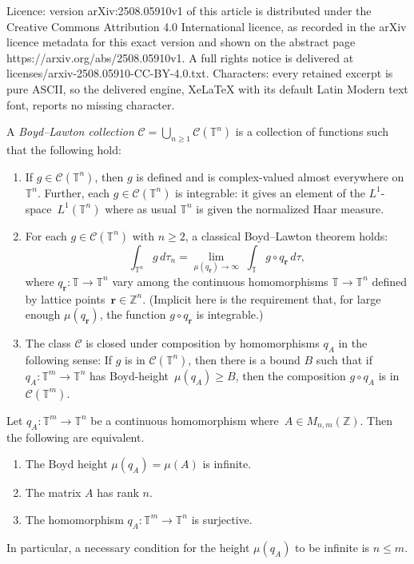 \documentclass[10pt,a4paper]{amsart}
\newcommand{\bZ}{{\mathbb{Z}}}
\newcommand{\mb}{\mathbf}
\newcommand{\mc}{\mathcal}
\newcommand{\torus}{{\mathbb{T}}}
\begin{document}
Licence: version arXiv:2508.05910v1 of this article is distributed under the Creative Commons Attribution 4.0 International licence, as recorded in the arXiv licence metadata for this exact version and shown on the abstract page https://arxiv.org/abs/2508.05910v1. A full rights notice is delivered at licenses/arxiv-2508.05910-CC-BY-4.0.txt. Characters: every retained excerpt is pure ASCII, so the delivered engine, XeLaTeX with its default Latin Modern text font, reports no missing character.
\begin{definition} \label{BL collection def}
A \emph{Boyd--Lawton collection} 
 $\mc C = \bigcup_{n \ge 1} \mc C (\torus^n)$ is a collection of functions such that the following hold:
\begin{enumerate}
\item
If $g \in \mc C (\torus^n)$, then $g$ is defined and is complex-valued almost everywhere on $\torus^n$. Further, each $g \in \mc C(\torus^n)$
is integrable: it gives an element of the $L^1$-space~$L^1(\torus^n)$ where as usual $\torus^n$ is given the normalized Haar measure.
\item
For each $g\in \mc C(\torus^n)$ with $n\ge 2$, a classical Boyd--Lawton theorem holds:
$$
\int_{\torus^n}  g \, d\tau_n= \lim_{\mu(q_\mb r)\to \infty}\;  \int_\torus g \circ q_{\mb r} \, d \tau,
$$
where $q_{\mb r} \colon \torus \to \torus^n$ vary among the continuous homomorphisms $\torus \to\torus^n$ defined by lattice points~$\mb r \in \bZ^n$.
(Implicit here is the requirement that, for large enough $\mu\left(q_\mb r\right)$, the function $g \circ q_{\mb r}$ is integrable.)

\item
The class $\mc C$ is closed under composition by homomorphisms $q_{A}$
in the following sense: If $g$ is in $\mc C(\torus^n)$, then there is a bound $B$ such that if $q_A \colon \torus^m \to \torus^n$ has Boyd-height~$\mu (q_A) \ge B$, 
then the composition  $g\circ q_{A}$ is in $\mc C(\torus^m)$.
\end{enumerate}
\end{definition}

\begin{proposition} \label{infinite_height_lemma}
Let $q_A \colon \torus^m \to \torus^n$ be a continuous homomorphism where~$A \in M_{n, m}(\bZ)$.
Then the following are equivalent.
\begin{enumerate}
\item
The Boyd height $\mu\left( q_A \right) = \mu(A)$ is infinite.
\item
The matrix $A$ has rank $n$.
\item
The homomorphism $q_A \colon \torus^m \to \torus^n$ is surjective.
\end{enumerate}
In particular, a necessary condition for the height $\mu\left( q_A \right)$ to be infinite is $n \le m$.
\end{proposition}
\end{document}
